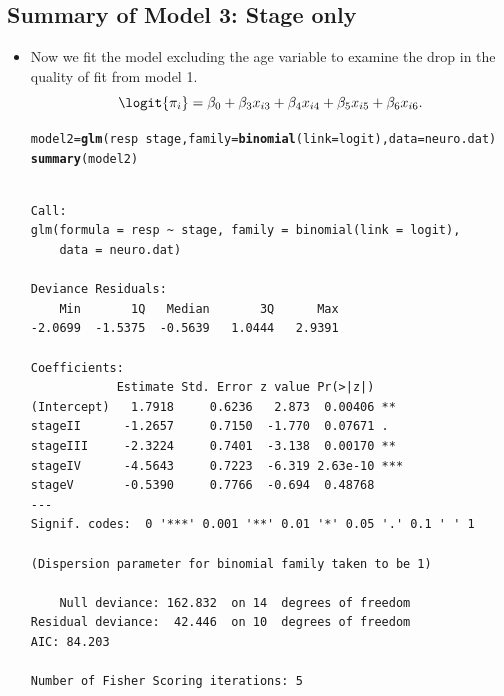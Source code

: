 \documentclass[oneside]{book}\usepackage[]{graphicx}\usepackage[svgnames]{xcolor}
\makeatletter
\newcommand{\hlopt}[1]{\textcolor[rgb]{0,0,0}{#1}}%
\newcommand{\hlstd}[1]{\textcolor[rgb]{0.345,0.345,0.345}{#1}}%
\newcommand{\hlkwb}[1]{\textcolor[rgb]{0.69,0.353,0.396}{#1}}%
\newcommand{\hlkwc}[1]{\textcolor[rgb]{0.333,0.667,0.333}{#1}}%
\newcommand{\hlkwd}[1]{\textcolor[rgb]{0.737,0.353,0.396}{\textbf{#1}}}%
\newenvironment{kframe}{%
 \def\at@end@of@kframe{}%
 \ifinner\ifhmode%
  \def\at@end@of@kframe{\end{minipage}}%
  \begin{minipage}{\columnwidth}%
 \fi\fi%
 \def\FrameCommand##1{\hskip\@totalleftmargin \hskip-\fboxsep
 \colorbox{shadecolor}{##1}\hskip-\fboxsep
     \hskip-\linewidth \hskip-\@totalleftmargin \hskip\columnwidth}%
 \MakeFramed {\advance\hsize-\width
   \@totalleftmargin\z@ \linewidth\hsize
   \@setminipage}}%
 {\par\unskip\endMakeFramed%
 \at@end@of@kframe}
\newenvironment{knitrout}{}{} %
\makeatother
\begin{document}
\subsection*{Summary of Model 3: Stage only}
\begin{itemize}
    \item Now we fit the model excluding the age variable to examine the drop in the
          quality of fit from model 1.
          \[ \logit{\pi_i}=\beta_0+\beta_3x_{i3}+\beta_4x_{i4}+\beta_5x_{i5}+\beta_6x_{i6}. \]
\begin{knitrout}
\color{fgcolor}\begin{kframe}
\begin{alltt}
\hlstd{model2} \hlkwb{=} \hlkwd{glm}\hlstd{(resp} \hlopt{~} \hlstd{stage,} \hlkwc{family} \hlstd{=} \hlkwd{binomial}\hlstd{(}\hlkwc{link} \hlstd{= logit),} \hlkwc{data} \hlstd{= neuro.dat)}
\hlkwd{summary}\hlstd{(model2)}
\end{alltt}
\begin{verbatim}

Call:
glm(formula = resp ~ stage, family = binomial(link = logit), 
    data = neuro.dat)

Deviance Residuals: 
    Min       1Q   Median       3Q      Max  
-2.0699  -1.5375  -0.5639   1.0444   2.9391  

Coefficients:
            Estimate Std. Error z value Pr(>|z|)    
(Intercept)   1.7918     0.6236   2.873  0.00406 ** 
stageII      -1.2657     0.7150  -1.770  0.07671 .  
stageIII     -2.3224     0.7401  -3.138  0.00170 ** 
stageIV      -4.5643     0.7223  -6.319 2.63e-10 ***
stageV       -0.5390     0.7766  -0.694  0.48768    
---
Signif. codes:  0 '***' 0.001 '**' 0.01 '*' 0.05 '.' 0.1 ' ' 1

(Dispersion parameter for binomial family taken to be 1)

    Null deviance: 162.832  on 14  degrees of freedom
Residual deviance:  42.446  on 10  degrees of freedom
AIC: 84.203

Number of Fisher Scoring iterations: 5
\end{verbatim}
\end{kframe}
\end{knitrout}
\end{itemize}
\end{document}

